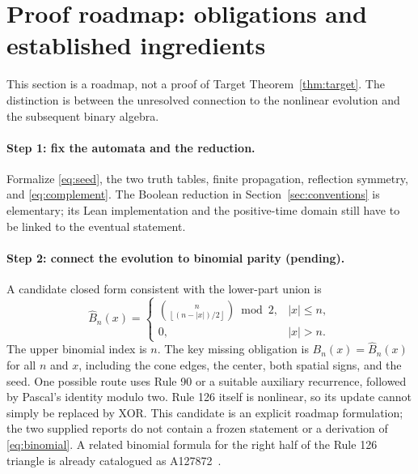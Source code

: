 \documentclass[11pt]{article}
\begin{document}
\section{Proof roadmap: obligations and established ingredients}
\label{sec:roadmap}

This section is a roadmap, not a proof of
Target Theorem~\ref{thm:target}. The distinction is between the unresolved
connection to the nonlinear evolution and the subsequent binary algebra.

\paragraph{Step 1: fix the automata and the reduction.}
Formalize \eqref{eq:seed}, the two truth tables, finite propagation, reflection
symmetry, and \eqref{eq:complement}. The Boolean reduction in
Section~\ref{sec:conventions} is elementary; its Lean implementation and
the positive-time domain still have to be linked to the eventual statement.

\paragraph{Step 2: connect the evolution to binomial parity (pending).}
A candidate closed form consistent with the lower-part union is
\begin{equation}
 \widehat B_n(x)=
 \begin{cases}
 \displaystyle\binom{n}{\left\lfloor(n-|x|)/2\right\rfloor}\bmod2,
       & |x|\leq n,\\[6pt]
 0,    & |x|>n.
 \end{cases}
 \label{eq:binomial}
\end{equation}
The upper binomial index is $n$. The key missing obligation is
$B_n(x)=\widehat B_n(x)$ for all $n$ and $x$, including the cone edges,
the center, both spatial signs, and the seed. One possible route uses
Rule 90 or a suitable auxiliary recurrence, followed by Pascal's identity
modulo two. Rule 126 itself is nonlinear, so its update cannot simply be
replaced by XOR. This candidate is an explicit roadmap formulation; the
two supplied reports do not contain a frozen statement or a derivation of
\eqref{eq:binomial}. A related binomial formula for the right half of the
Rule 126 triangle is already catalogued as A127872~\cite{oeis127872}.
\end{document}
